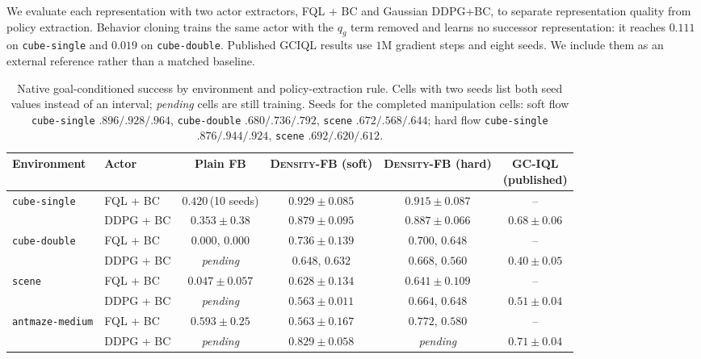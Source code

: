 \documentclass{article}
\newcommand{\DensityFB}{\textsc{Density-FB}}
\begin{document}
We evaluate each representation with two actor extractors, FQL + BC and Gaussian DDPG+BC, to separate representation quality from policy extraction.
Behavior cloning trains the same actor with the $q_g$ term removed and learns no successor representation: it reaches $0.111$ on \texttt{cube-single} and $0.019$ on \texttt{cube-double}.
Published GCIQL results use $1$M gradient steps and eight seeds.
We include them as an external reference rather than a matched baseline.

\begin{table}[h]
\centering
\small
\setlength{\tabcolsep}{3pt}
\begin{tabular}{llcccc}
\toprule
Environment & Actor & Plain FB & \DensityFB{} (soft) & \DensityFB{} (hard) & \shortstack{GC-IQL\\(published)} \\
\midrule
\texttt{cube-single}
& FQL + BC
& $0.420$\,(10 seeds)
& $\mathbf{0.929 \pm 0.085}$
& $0.915 \pm 0.087$
& -- \\

& DDPG + BC
& $0.353 \pm 0.38$
& $0.879 \pm 0.095$
& $0.887 \pm 0.066$
& $0.68 \pm 0.06$ \\
\midrule

\texttt{cube-double}
& FQL + BC
& $0.000$, $0.000$
& $\mathbf{0.736 \pm 0.139}$
& $0.700$, $0.648$
& -- \\

& DDPG + BC
& \emph{pending}
& $0.648$, $0.632$
& $0.668$, $0.560$
& $0.40 \pm 0.05$ \\
\midrule

\texttt{scene}
& FQL + BC
& $0.047 \pm 0.057$
& $0.628 \pm 0.134$
& $\mathbf{0.641 \pm 0.109}$
& -- \\

& DDPG + BC
& \emph{pending}
& $0.563 \pm 0.011$
& $0.664$, $0.648$
& $0.51 \pm 0.04$ \\
\midrule

\texttt{antmaze-medium}
& FQL + BC
& $0.593 \pm 0.25$
& $0.563 \pm 0.167$
& $0.772$, $0.580$
& -- \\

& DDPG + BC
& \emph{pending}
& $\mathbf{0.829 \pm 0.058}$
& \emph{pending}
& $0.71 \pm 0.04$ \\
\bottomrule
\end{tabular}

\caption{
Native goal-conditioned success by environment and policy-extraction rule.
Cells with two seeds list both seed values instead of an interval; \emph{pending} cells are still training.
Seeds for the completed manipulation cells:
soft flow \texttt{cube-single} $.896/.928/.964$,
\texttt{cube-double} $.680/.736/.792$,
\texttt{scene} $.672/.568/.644$;
hard flow \texttt{cube-single} $.876/.944/.924$,
\texttt{scene} $.692/.620/.612$.
}
\label{tab:main}
\end{table}
\end{document}
